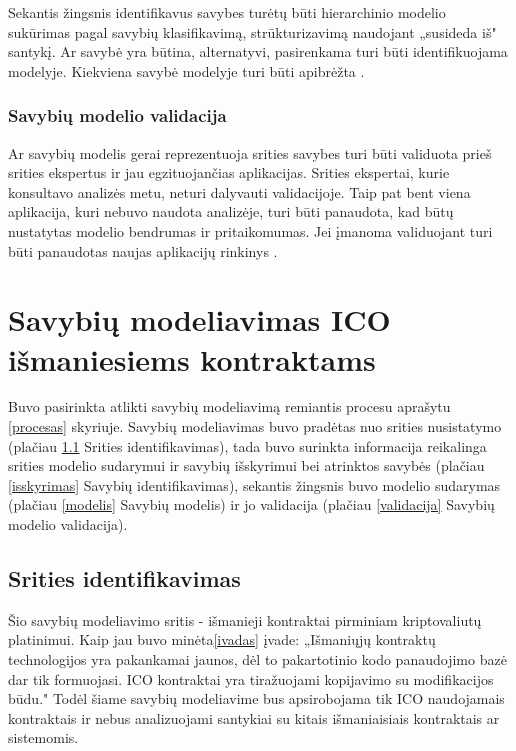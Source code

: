\documentclass{VUMIFPSkursinis}
\begin{document}
Sekantis žingsnis identifikavus savybes turėtų būti hierarchinio modelio sukūrimas pagal savybių klasifikavimą, strūkturizavimą naudojant „susideda iš" santykį. Ar savybė yra būtina, alternatyvi, pasirenkama turi būti identifikuojama modelyje. Kiekviena savybė modelyje turi būti apibrėžta \cite{Kang1990}.

\subsubsection{Savybių modelio validacija}

Ar savybių modelis gerai reprezentuoja srities savybes turi būti validuota prieš srities ekspertus ir  jau egzituojančias aplikacijas. Srities ekspertai, kurie konsultavo analizės metu, neturi dalyvauti validacijoje. Taip pat bent viena aplikacija, kuri nebuvo naudota analizėje, turi būti panaudota, kad  būtų nustatytas modelio bendrumas ir pritaikomumas. Jei įmanoma validuojant turi būti panaudotas naujas aplikacijų rinkinys \cite{Kang1990}.
 


\section{Savybių modeliavimas ICO išmaniesiems kontraktams}

Buvo pasirinkta atlikti savybių modeliavimą remiantis procesu aprašytu \ref{procesas} skyriuje. Savybių modeliavimas buvo pradėtas nuo srities nusistatymo (plačiau \ref{sritis} Srities identifikavimas), tada buvo surinkta informacija reikalinga srities modelio sudarymui ir savybių išskyrimui bei atrinktos savybės (plačiau \ref{isskyrimas} Savybių identifikavimas), sekantis žingsnis buvo modelio sudarymas (plačiau \ref{modelis} Savybių modelis) ir jo validacija (plačiau \ref{validacija} Savybių modelio validacija).

\subsection{Srities identifikavimas} \label{sritis}

Šio savybių modeliavimo sritis - išmanieji kontraktai pirminiam kriptovaliutų platinimui. Kaip jau buvo minėta\ref{ivadas} įvade: „Išmaniųjų kontraktų technologijos yra pakankamai jaunos, dėl to pakartotinio kodo panaudojimo bazė dar tik formuojasi. ICO kontraktai yra tiražuojami kopijavimo su modifikacijos būdu." Todėl šiame savybių modeliavime bus apsirobojama tik ICO naudojamais kontraktais ir nebus analizuojami santykiai su kitais išmaniaisiais kontraktais ar sistemomis.
\end{document}
